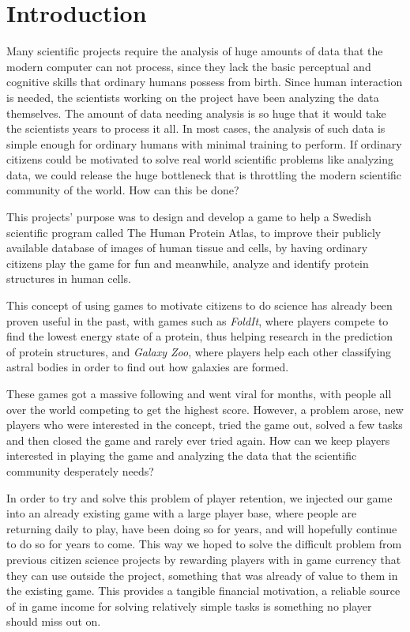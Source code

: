 \section{Introduction}\label{sec:introduction}

Many scientific projects require the analysis of huge amounts of data that the modern computer can not process, since they lack the basic perceptual and cognitive skills that ordinary humans possess from birth. Since human interaction is needed, the scientists working on the project have been analyzing the data themselves. 
The amount of data needing analysis is so huge that it would take the scientists years to process it all. In most cases, the analysis of such data is simple enough for ordinary humans with minimal training to perform. If ordinary citizens could be motivated to solve real world scientific problems like analyzing data, we could release the huge bottleneck that is throttling the modern scientific community of the world. How can this be done?

This projects' purpose was to design and develop a game to help a Swedish scientific program called The Human Protein Atlas, to improve their publicly available database of images of human tissue and cells, by having ordinary citizens play the game for fun and meanwhile, analyze and identify protein structures in human cells.

This concept of using games to motivate citizens to do science has already been proven useful in the past, with games such as \emph{FoldIt}, where players compete to find the lowest energy state of a protein, thus helping research in the prediction of protein structures, and \emph{Galaxy Zoo}, where players help each other classifying astral bodies in order to find out how galaxies are formed.

These games got a massive following and went viral for months, with people all over the world competing to get the highest score. However, a problem arose, new players who were interested in the concept, tried the game out, solved a few tasks and then closed the game and rarely ever tried again. How can we keep players interested in playing the game and analyzing the data that the scientific community desperately needs?

In order to try and solve this problem of player retention, we injected our game into an already existing game with a large player base, where people are returning daily to play, have been doing so for years, and will hopefully continue to do so for years to come. This way we hoped to solve the difficult problem from previous citizen science projects by rewarding players with in game currency that they can use outside the project, something that was already of value to them in the existing game. This provides a tangible financial motivation, a reliable source of in game income for solving relatively simple tasks is something no player should miss out on.





